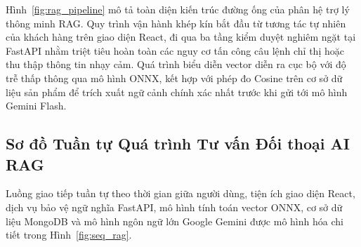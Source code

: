 Hình~\ref{fig:rag_pipeline} mô tả toàn diện kiến trúc đường ống của phân hệ trợ lý thông minh RAG. Quy trình vận hành khép kín bắt đầu từ tương tác tự nhiên của khách hàng trên giao diện React, đi qua ba tầng kiểm duyệt nghiêm ngặt tại FastAPI nhằm triệt tiêu hoàn toàn các nguy cơ tấn công câu lệnh chỉ thị hoặc thu thập thông tin nhạy cảm. Quá trình biểu diễn vector diễn ra cục bộ với độ trễ thấp thông qua mô hình ONNX, kết hợp với phép đo Cosine trên cơ sở dữ liệu sản phẩm để trích xuất ngữ cảnh chính xác nhất trước khi gửi tới mô hình Gemini Flash.

\subsection{Sơ đồ Tuần tự Quá trình Tư vấn Đối thoại AI RAG}
Luồng giao tiếp tuần tự theo thời gian giữa người dùng, tiện ích giao diện React, dịch vụ bảo vệ ngữ nghĩa FastAPI, mô hình tính toán vector ONNX, cơ sở dữ liệu MongoDB và mô hình ngôn ngữ lớn Google Gemini được mô hình hóa chi tiết trong Hình~\ref{fig:seq_rag}.

